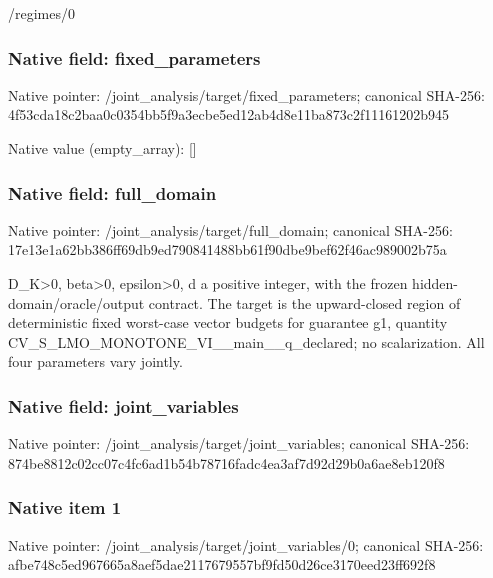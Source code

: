 \documentclass[10pt,a4paper]{article}
\begin{document}
\begingroup\raggedright\sloppy /\allowbreak{}regimes/\allowbreak{}0\par\endgroup

\subsubsection{Native field: fixed\_\allowbreak{}parameters}
Native pointer: /joint\_\allowbreak{}analysis/target/fixed\_\allowbreak{}parameters; canonical SHA-256: 4f53cda18c2baa0c0354bb5f9a3ecbe5ed12ab4d8e11ba873c2f11161202b945

Native value (empty\_\allowbreak{}array): []

\subsubsection{Native field: full\_\allowbreak{}domain}
Native pointer: /joint\_\allowbreak{}analysis/target/full\_\allowbreak{}domain; canonical SHA-256: 17e13e1a62bb386ff69db9ed790841488bb61f90dbe9bef62f46ac989002b75a

\begingroup\raggedright\sloppy D\_\allowbreak{}K>0,\allowbreak{} beta>0,\allowbreak{} epsilon>0,\allowbreak{} d a positive integer,\allowbreak{} with the frozen hidden-domain/\allowbreak{}oracle/\allowbreak{}output contract. The target is the upward-closed region of deterministic fixed worst-case vector budgets for guarantee g1,\allowbreak{} quantity CV\_\allowbreak{}S\_\allowbreak{}LMO\_\allowbreak{}MONOTONE\_\allowbreak{}VI\_\allowbreak{}\_\allowbreak{}main\_\allowbreak{}\_\allowbreak{}q\_\allowbreak{}declared;\allowbreak{} no scalarization. All four parameters vary jointly.\par\endgroup

\subsubsection{Native field: joint\_\allowbreak{}variables}
Native pointer: /joint\_\allowbreak{}analysis/target/joint\_\allowbreak{}variables; canonical SHA-256: 874be8812c02cc07c4fc6ad1b54b78716fadc4ea3af7d92d29b0a6ae8eb120f8

\subsubsection{Native item 1}
Native pointer: /joint\_\allowbreak{}analysis/target/joint\_\allowbreak{}variables/0; canonical SHA-256: afbe748c5ed967665a8aef5dae2117679557bf9fd50d26ce3170eed23ff692f8
\end{document}
